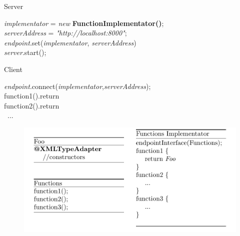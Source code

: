 \documentclass{article}
\begin{document}
\begin{algorithm}[H]
\caption{Server}
\emph{implementator} = \emph{new} \textbf{FunctionImplementator()}; \\
\emph{serverAddress} = \emph{"http://localhost:8000"};\\
\emph{endpoint}.set(\emph{implementator}, \emph{serverAddress})\\
\emph{server}.start();
\end{algorithm}

\begin{algorithm}[H]
\caption{Client}
\emph{endpoint}.connect(\emph{implementator},\emph{serverAddress});\\
function1().return\\
function2().return\\
\-\ \quad ...
\end{algorithm}
 
\begin{figure}[H]
  \centering
  \includegraphics[scale=1]{cattura15.png}
\end{figure}
\end{document}
